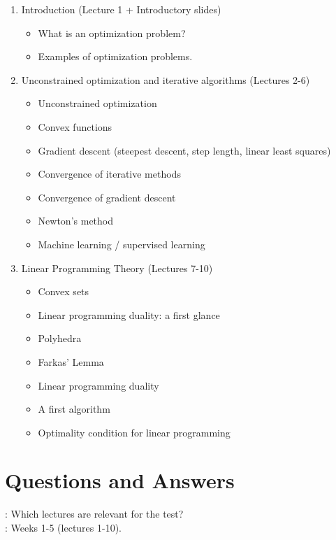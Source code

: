 \documentclass[11pt,a4paper]{memoir}
\begin{document}
\begin{enumerate}
\item Introduction (Lecture 1 + Introductory slides)
\begin{itemize}
 \item What is an optimization problem?
 \item Examples of optimization problems.
\end{itemize}
\item Unconstrained optimization and iterative algorithms (Lectures 2-6)
\begin{itemize}
 \item Unconstrained optimization
 \item Convex functions
 \item Gradient descent (steepest descent, step length, linear least squares)
 \item Convergence of iterative methods
 \item Convergence of gradient descent
 \item Newton's method
 \item Machine learning / supervised learning
\end{itemize}
\item Linear Programming Theory (Lectures 7-10)
\begin{itemize}
 \item Convex sets
 \item Linear programming duality: a first glance
 \item Polyhedra
 \item Farkas' Lemma
 \item Linear programming duality
 \item A first algorithm
 \item Optimality condition for linear programming
\end{itemize}

\end{enumerate}

\newpage

\section*{Questions and Answers}

: Which lectures are relevant for the test?\\

: Weeks 1-5 (lectures 1-10). \\
\end{document}
